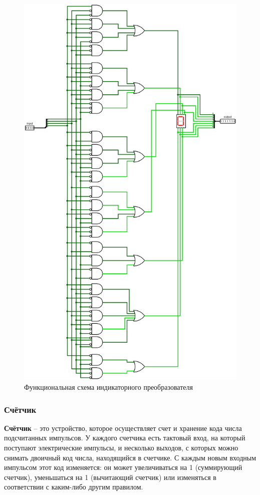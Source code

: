 \documentclass[11pt,a4paper,final]{article} %
\begin{document}
\newpage
\thispagestyle{empty}
\begin{figure}[H]
	\centering
	\includegraphics[width=0.85 \linewidth]{img/IC.png}
	\caption{Функциональная схема индикаторного преобразователя}
	\label{fig:IC}
\end{figure}

\newpage

\subsubsection{Счётчик}

\textbf{Счётчик} -- это устройство, которое осуществляет счет и хранение кода числа подсчитанных импульсов. У 
каждого счетчика есть тактовый вход, на который поступают электрические импульсы, и несколько 
выходов, с которых можно снимать двоичный код числа, находящийся в счетчике. С каждым новым 
входным импульсом этот код изменяется: он может увеличиваться на 1 (суммирующий счетчик), 
уменьшаться на 1 (вычитающий счетчик) или изменяться в соответствии с каким-либо другим правилом. 
\end{document}
